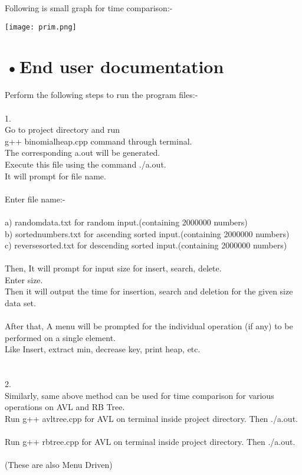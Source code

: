 Following is small graph for time comparison:-


\texttt{[image: prim.png]} 

   \section*{•End user documentation} 


	Perform the following steps to run the program files:- \\ \\
1. \\Go to project directory and run \\
g++ binomialheap.cpp command through terminal.\\
The corresponding a.out will be generated. \\
Execute this file using the command ./a.out.\\
It will prompt for file name.\\ \\
Enter file name:- \\ \\
a) randomdata.txt for random input.(containing 2000000 numbers)\\
b) sortednumbers.txt for ascending sorted input.(containing 2000000 numbers)\\
c) reversesorted.txt for descending sorted input.(containing 2000000 numbers)\\ \\

Then, It will prompt for input size for insert, search, delete.\\
Enter size.\\

Then it will output the time for insertion, search and deletion for the given size data set.\\ \\
After that,
A menu will be prompted for the individual operation (if any) to be performed on a single element.\\
Like Insert, extract min, decrease key, print heap, etc.\\ \\ \\
	
2. \\Similarly, same above method can be used for time comparison for various operations on AVL and RB Tree.\\ 
Run g++ avltree.cpp for AVL on terminal inside project directory. Then ./a.out.\\ \\ 
Run g++ rbtree.cpp for AVL on terminal inside project directory. Then ./a.out.\\ \\ 
(These are also Menu Driven) \\ \\ \\

